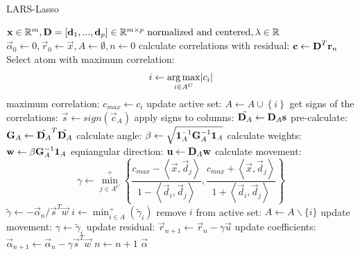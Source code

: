 \newpage
\begin{algorithm}[H]
\caption{LARS-Lasso}
\label{alg:lars}
\begin{algorithmic}[1]
\REQUIRE $\boldsymbol{\mathrm{x}} \in \mathbb{R}^m, \boldsymbol{\mathrm{D}} =[\boldsymbol{\mathrm{d}}_1,...,\boldsymbol{\mathrm{d}}_p] \in
\mathbb{R}^{m\times p} \text{ normalized and centered},\lambda \in \mathbb{R}$
\STATE $\vec{\alpha}_0 \gets 0, \vec{r}_0 \gets \vec{x}, A \gets \emptyset, n
\gets 0$
\STATE calculate correlations with residual: $\boldsymbol{\mathrm{c}} \gets
\boldsymbol{\mathrm{D}}^T\boldsymbol{\mathrm{r}}_n$
\STATE Select atom with maximum correlation: 
\begin{equation*}
i \gets \argmax_{i \in A^C} \lvert c_i  \rvert %
\end{equation*}
\STATE maximum correlation: $c_{max} \gets c_i $ %
\STATE update active set: $A \gets A \cup \left\{i\right\} $
\STATE get signs of the correlations: $\vec{s} \gets 
sign\left(\vec{c}_A\right)$
\STATE apply signs to columns: $\tilde{\boldsymbol{\mathrm{D}}_A} \gets \boldsymbol{\mathrm{D}}_A\boldsymbol{\mathrm{s}}$
\STATE pre-calculate: $\boldsymbol{\mathrm{G}}_A \gets \tilde{\boldsymbol{\mathrm{D}}_A}^T\tilde{\boldsymbol{\mathrm{D}}_A}$
\STATE calculate angle: $\beta \gets \sqrt{ \boldsymbol{\mathrm{1}}_A^{-1} \boldsymbol{\mathrm{G}}_A^{-1}
\boldsymbol{\mathrm{1}}_A}$
\STATE calculate weights: $\boldsymbol{\mathrm{w}} \gets \beta\boldsymbol{\mathrm{G}}_A^{-1}\boldsymbol{\mathrm{1}}_A$
\STATE equiangular direction: $\boldsymbol{\mathrm{u}} \gets \boldsymbol{\mathrm{D}}_A\boldsymbol{\mathrm{w}}$
\STATE calculate movement:
\begin{equation*}
\gamma \gets \min_{j\in A^C}^{+} \left\lbrace \frac{c_{max}-\left<
\vec{x},\vec{d}_j \right> }{1-\left< \vec{d}_i,\vec{d}_j \right> },
\frac{c_{max}+\left< \vec{x},\vec{d}_j \right>}{1+\left< \vec{d}_i,\vec{d}_j
\right> } \right\rbrace
\end{equation*}
\STATE $ \tilde{\gamma} \gets -\vec{\alpha}_n/\vec{s}^T\vec{w}  $
\STATE $ i \gets \min_{i\in A}^{+} \left( \tilde{\gamma}_i \right) $
\STATE remove $i$ from active  set: $ A \gets A \backslash \{i\} $
\STATE update movement: $ \gamma \gets \tilde{\gamma}_i $  
\ENDIF
\ENDIF
\STATE update residual: $ \vec{r}_{n+1} \gets \vec{r}_{n} - \gamma \vec{u}$
\STATE update coefficients: $ \vec{\alpha}_{n+1} \gets \vec{\alpha}_n - \gamma
\vec{s}^T\vec{w} $
\STATE $n \gets n + 1$ 
\ENDWHILE
\RETURN $\vec{\alpha}$
\end{algorithmic}
\end{algorithm}

